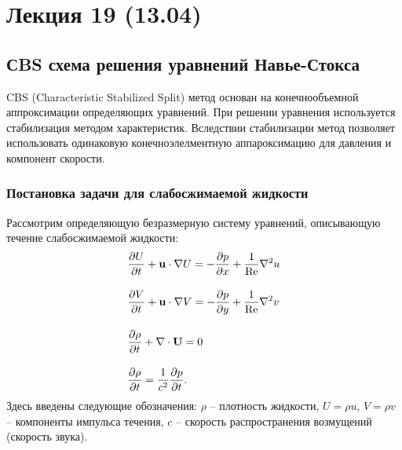\section{Лекция 19 (13.04)}

\subsection{СBS схема решения уравнений Навье-Стокса}
CBS (Characteristic Stabilized Split)
метод основан на конечнообъемной аппроксимации определяющих уравнений.
При решении уравнения используется стабилизация методом характеристик.
Вследствии стабилизации метод позволяет использовать одинаковую конечноэлелментную
аппароксимацию для давления и компонент скорости.

\subsubsection{Постановка задачи для слабосжимаемой жидкости}
Рассмотрим определяющую безразмерную систему уравнений, описывающую
течение слабосжимаемой жидкости:
\begin{align}
\label{eq:cbs_u}
&\frac{\partial U}{\partial t} + \boldsymbol{\rm u}\cdot\nabla U = -\frac{\partial p}{\partial x} + \frac{1}{\mathrm{Re}}\nabla^2 u \\[10pt]
\label{eq:cbs_v}
&\frac{\partial V}{\partial t} + \boldsymbol{\rm u}\cdot\nabla V = -\frac{\partial p}{\partial y} + \frac{1}{\mathrm{Re}}\nabla^2 v \\[10pt]
\label{eq:cbs_rho}
&\frac{\partial \rho}{\partial t} + \nabla\cdot\boldsymbol{\rm U} = 0 \\[10pt]
\label{eq:cbs_rho_p}
&\frac{\partial \rho}{\partial t} = \frac{1}{c^2}\frac{\partial p}{\partial t}.
\end{align}
Здесь введены следующие обозначения:
$\rho$ -- плотность жидкости,
$U = \rho u$, $V = \rho v$ -- компоненты импульса течения,
$c$ -- скорость распространения возмущений (скорость звука).

